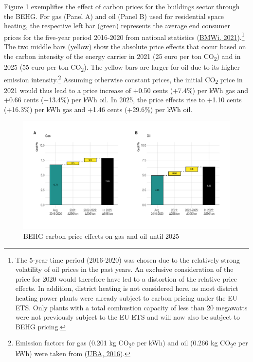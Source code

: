 \documentclass[12pt,twoside]{reedthesis}
\begin{document}
Figure \ref{fig:behg} exemplifies the effect of carbon prices for the buildings sector through the BEHG. For gas (Panel A) and oil (Panel B) used for residential space heating, the respective left bar (green) represents the average end consumer prices for the five-year period 2016-2020 from national statistics (\protect\hyperlink{ref-bmwi21}{BMWi, 2021}).\footnote{The 5-year time period (2016-2020) was chosen due to the relatively strong volatility of oil prices in the past years. An exclusive consideration of the price for 2020 would therefore have led to a distortion of the relative price effects. In addition, district heating is not considered here, as most district heating power plants were already subject to carbon pricing under the EU ETS. Only plants with a total combustion capacity of less than 20 megawatts were not previously subject to the EU ETS and will now also be subject to BEHG pricing.} The two middle bars (yellow) show the absolute price effects that occur based on the carbon intensity of the energy carrier in 2021 (25 euro per ton CO\textsubscript{2}) and in 2025 (55 euro per ton CO\textsubscript{2}). The yellow bars are larger for oil due to its higher emission intensity.\footnote{Emission factors for gas (0.201 kg CO\textsubscript{2}e per kWh) and oil (0.266 kg CO\textsubscript{2}e per kWh) were taken from (\protect\hyperlink{ref-uba16}{UBA, 2016}).} Assuming otherwise constant prices, the initial CO\textsubscript{2} price in 2021 would thus lead to a price increase of +0.50 cents (+7.4\%) per kWh gas and +0.66 cents (+13.4\%) per kWh oil. In 2025, the price effects rise to +1.10 cents (+16.3\%) per kWh gas and +1.46 cents (+29.6\%) per kWh oil.
\begin{figure}

{\centering \includegraphics[width=1\linewidth]{figure/price_effect_behg} 

}

\caption[BEHG carbon price effects on gas and oil until 2025]{BEHG carbon price effects on gas and oil until 2025}\label{fig:behg}
\end{figure}
\end{document}
